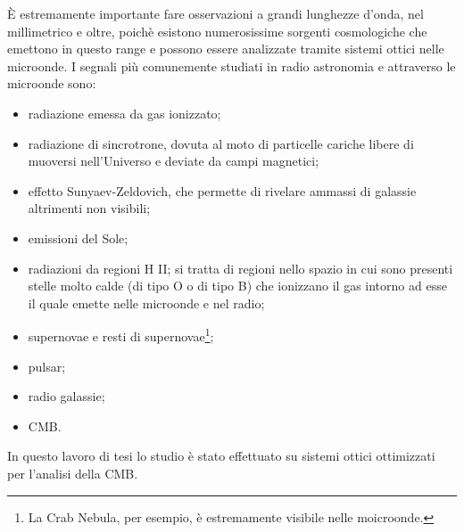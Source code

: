 \documentclass[12pt,a4paper,final]{book}
\begin{document}
\`E estremamente importante fare osservazioni a grandi lunghezze d'onda, nel millimetrico e oltre, poichè esistono numerosissime sorgenti cosmologiche che emettono in questo range e possono essere analizzate tramite sistemi ottici nelle microonde.
I segnali più comunemente studiati in radio astronomia e attraverso le microonde sono:
\begin{itemize}
	\item radiazione emessa da gas ionizzato;
	\item radiazione di sincrotrone, dovuta al moto di particelle cariche libere di muoversi nell'Universo e deviate da campi magnetici;
	\item effetto Sunyaev-Zeldovich, che permette di rivelare ammassi di galassie altrimenti non visibili;
	\item emissioni del Sole;
	\item radiazioni da regioni H II; si tratta di regioni nello spazio in cui sono presenti stelle molto calde (di tipo O o di tipo B) che ionizzano il gas intorno ad esse il quale emette nelle microonde e nel radio;
	\item supernovae e resti di supernovae\footnote{La Crab Nebula, per esempio, è estremamente visibile nelle moicroonde.};
	\item pulsar;
	\item radio galassie;
	\item CMB.
\end{itemize}
In questo lavoro di tesi lo studio è stato effettuato su sistemi ottici ottimizzati per l'analisi della CMB.
\end{document}
